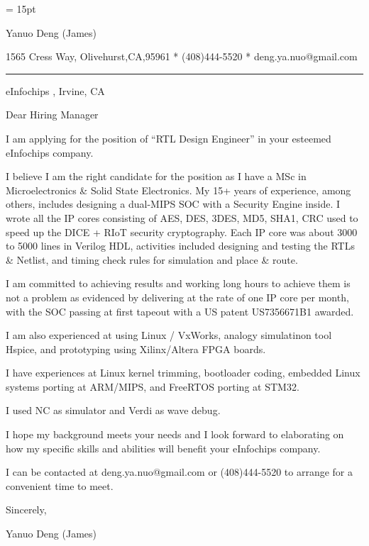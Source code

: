 

  \FFrg \baselineskip = 15pt

{
Yanuo Deng (James)
}

{ 
1565 Cress Way, Olivehurst,CA,95961
*
(408)444-5520
*
deng.ya.nuo@gmail.com
}

{ \smallbreak } 
{\par\noindent\hrule} 
{ \medbreak } { 
}

%
%

{ \bigbreak } 

eInfochips , Irvine, CA

{ 
Dear Hiring Manager
}

{ \bigbreak } 
I am applying for the position of ``RTL Design Engineer'' in your esteemed eInfochips company.

{ \bigbreak } 
I believe I am the right candidate for the position as I have a MSc in Microelectronics \& Solid State Electronics.
My 15+ years of experience, among others, 
includes designing a dual-MIPS SOC with a Security Engine inside. 
I wrote all the IP cores consisting of AES, DES, 3DES, MD5, SHA1, CRC 
used to speed up the DICE + RIoT security cryptography.
Each IP core was about 3000 to 5000 lines in Verilog HDL, 
activities included designing and testing the RTLs \& Netlist,
and timing check rules for simulation and place \& route.

{ \bigbreak } 
I am committed to achieving results and working long hours 
to achieve them is not a problem as evidenced by 
delivering at the rate of one IP core per month,
with the SOC passing at first tapeout
with a US patent US7356671B1 awarded.

{ \bigbreak } 
I am also experienced at using Linux / VxWorks, 
analogy simulatinon tool Hspice, 
and prototyping using Xilinx/Altera FPGA boards.

{ \bigbreak } 
I have experiences at Linux kernel trimming, bootloader coding, embedded Linux systems porting at ARM/MIPS, and FreeRTOS porting at STM32.

{ \bigbreak } 
I used NC as simulator and Verdi as wave debug. 

{ \bigbreak } 
I hope my background meets your needs and I look
forward to elaborating on how my specific skills and abilities will benefit your eInfochips company.

{ \bigbreak } 
I can be contacted at deng.ya.nuo@gmail.com
or (408)444-5520 to arrange for a convenient time to meet.

{ \bigbreak } 




\vskip 60pt

{ \bigbreak } 
Sincerely,

Yanuo Deng (James)

\bye

